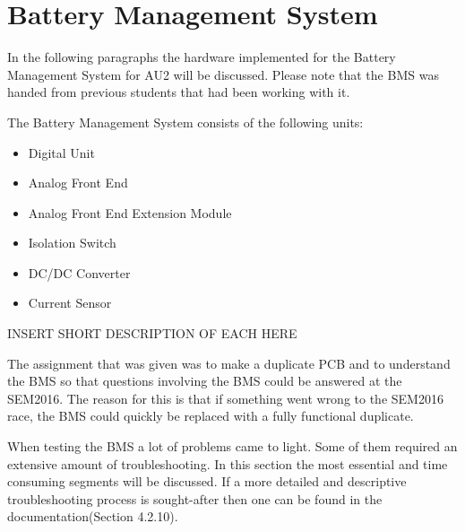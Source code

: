 \section{Battery Management System}
In the following paragraphs the hardware implemented for the Battery Management System for AU2 will be discussed. Please note that the BMS was handed from previous students that had been working with it.

The Battery Management System consists of the following units:
\begin{itemize}
	\item{Digital Unit}
	\item{Analog Front End}
	\item{Analog Front End Extension Module}
	\item{Isolation Switch}
	\item{DC/DC Converter}
	\item{Current Sensor}
\end{itemize}

INSERT SHORT DESCRIPTION OF EACH HERE


The assignment that was given was to make a duplicate PCB and to understand the BMS so that questions involving the BMS could be answered at the SEM2016. The reason for this is that if something went wrong to the SEM2016 race, the BMS could quickly be replaced with a fully functional duplicate.

When testing the BMS a lot of problems came to light. Some of them required an extensive amount of troubleshooting. In this section the most essential and time consuming segments will be discussed. If a more detailed and descriptive troubleshooting process is sought-after then one can be found in the documentation\cite{AU2}(Section 4.2.10).

